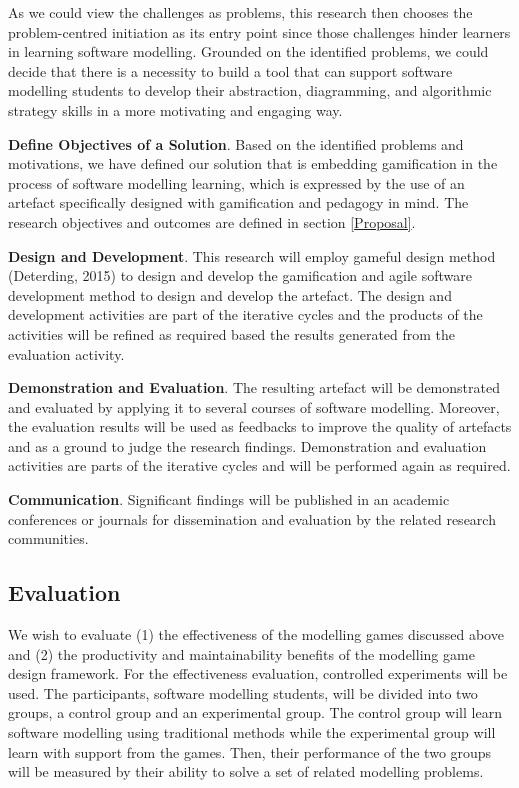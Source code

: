 \documentclass[12pt, a4paper]{report}
\begin{document}
As we could view the challenges as problems, this research then chooses the problem-centred initiation as its entry point since those challenges hinder learners in learning software modelling. Grounded on the identified problems, we could decide that there is a necessity to build a tool that can support software modelling students to develop their abstraction, diagramming, and algorithmic strategy skills in a more motivating and engaging way. 

\textbf{Define Objectives of a Solution}. Based on the identified problems and motivations, we have defined our solution that is embedding gamification in the process of software modelling learning, which is expressed by the use of an artefact specifically designed with gamification and pedagogy in mind. The research objectives and outcomes are defined in section \ref{Proposal}.

\textbf{Design and Development}. This research will employ gameful design method (Deterding, 2015) to design and develop the gamification and agile software development method to design and develop the artefact. The design and development activities are part of the iterative cycles and the products of the activities will be refined as required based the results generated from the evaluation activity.

\textbf{Demonstration and Evaluation}. The resulting artefact will be demonstrated and evaluated by applying it to several courses of software modelling. Moreover, the evaluation results will be used as feedbacks to improve the quality of artefacts and as a ground to judge the research findings. Demonstration and evaluation activities are parts of the iterative cycles and will be performed again as required. 

\textbf{Communication}. Significant findings will be published in an academic conferences or journals for dissemination and evaluation by the related research communities.

\subsection{Evaluation}
We wish to evaluate (1) the effectiveness of the modelling games discussed above and (2) the productivity and maintainability benefits of the modelling game design framework. For the effectiveness evaluation, controlled experiments will be used. The participants, software modelling students, will be divided into two groups, a control group and an experimental group. The control group will learn software modelling using traditional methods while the experimental group will learn with support from the games. Then, their performance of the two groups will be measured by their ability to solve a set of related modelling problems. 
\end{document}
